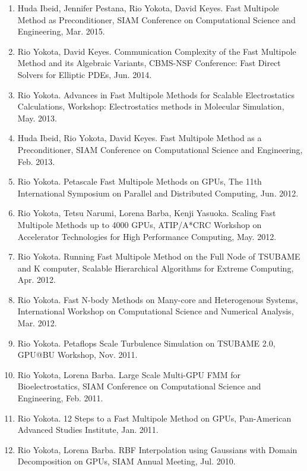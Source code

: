 \documentclass[margin,line]{cv}
\begin{document}
\begin{resume}
\begin{enumerate}
\item Huda Ibeid, Jennifer Pestana, Rio Yokota, David Keyes. Fast Multipole Method as Preconditioner, SIAM Conference on Computational Science and Engineering, Mar. 2015.

\item Rio Yokota, David Keyes. Communication Complexity of the Fast Multipole Method and its Algebraic Variants, CBMS-NSF Conference: Fast Direct Solvers for Elliptic PDEs, Jun. 2014.

\item Rio Yokota. Advances in Fast Multipole Methods for Scalable Electrostatics Calculations, Workshop: Electrostatics methods in Molecular Simulation, May. 2013.

\item Huda Ibeid, Rio Yokota, David Keyes. Fast Multipole Method as a Preconditioner, SIAM Conference on Computational Science and Engineering, Feb. 2013.

\item Rio Yokota. Petascale Fast Multipole Methods on GPUs, The 11th International Symposium on Parallel and Distributed Computing, Jun. 2012.

\item Rio Yokota, Tetsu Narumi, Lorena Barba, Kenji Yasuoka. Scaling Fast Multipole Methods up to 4000 GPUs, ATIP/A*CRC Workshop on Accelerator Technologies for High Performance Computing, May. 2012.

\item Rio Yokota. Running Fast Multipole Method on the Full Node of TSUBAME and K computer, Scalable Hierarchical Algorithms for Extreme Computing, Apr. 2012.

\item Rio Yokota. Fast N-body Methods on Many-core and Heterogenous Systems, International Workshop on Computational Science and Numerical Analysis, Mar. 2012.

\item Rio Yokota. Petaflops Scale Turbulence Simulation on TSUBAME 2.0, GPU@BU Workshop, Nov. 2011.

\item Rio Yokota, Lorena Barba. Large Scale Multi-GPU FMM for Bioelectrostatics, SIAM Conference on Computational Science and Engineering, Feb. 2011.

\item Rio Yokota. 12 Steps to a Fast Multipole Method on GPUs, Pan-American Advanced Studies Institute, Jan. 2011.

\item Rio Yokota, Lorena Barba. RBF Interpolation using Gaussians with Domain Decomposition on GPUs, SIAM Annual Meeting, Jul. 2010.


\end{enumerate}
\end{resume}
\end{document}
